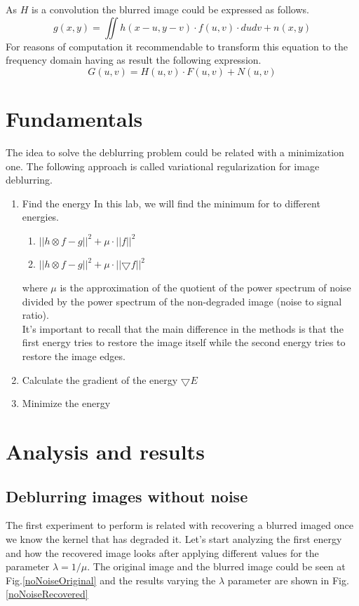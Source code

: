 \documentclass[a4paper, 10pt, conference] {article}
\begin{document}
As \textit{$H$} is a convolution the blurred image could be expressed as follows. 
\begin{equation}
g(x,y) = \iint h(x-u, y-v) \cdot f(u,v) \cdot dudv + n(x,y)
\end{equation}
For reasons of computation it recommendable to transform this equation to the frequency domain having as result the following expression.
\begin{equation}
G(u,v) = H(u,v) \cdot F(u,v) + N(u,v)
\end{equation}

\section{Fundamentals}
The idea to solve the deblurring problem could be related with a minimization one. The following approach is called variational regularization for image deblurring.
\begin{enumerate} %
	\item Find the energy
	In this lab, we will find the minimum for to different energies.
	\begin{enumerate}
		\item $\left|\left|  h\otimes f - g \right|\right|^{2} + \mu \cdot \left| \left|f \right|\right|^{2} $ 
		\item $\left|\left|  h\otimes f - g \right|\right|^{2} + \mu \cdot \left| \left|\bigtriangledown f \right|\right|^{2} $
 	\end{enumerate}
 	where $\mu $ is the approximation of the quotient of the power spectrum of noise divided by the power spectrum of the non-degraded image (noise to signal ratio).\\
 	It's important to recall that the main difference in the methods is that the first energy tries to restore the image itself while the second energy tries to restore the image edges.
	 
	\item Calculate the gradient of the energy $\bigtriangledown E$ 
	
	\item Minimize the energy
 	
\end{enumerate}

\section{Analysis and results}
\subsection{ Deblurring images without noise}
The first experiment to perform is related with recovering a blurred imaged once we know the kernel that has degraded it. Let's start analyzing the first energy and how the recovered image looks after applying different values for the parameter $ \lambda = 1 / \mu$. The original image and the blurred image could be seen at Fig.\ref{noNoiseOriginal} and the results varying the $\lambda$ parameter are shown in Fig.\ref{noNoiseRecovered}
\end{document}
